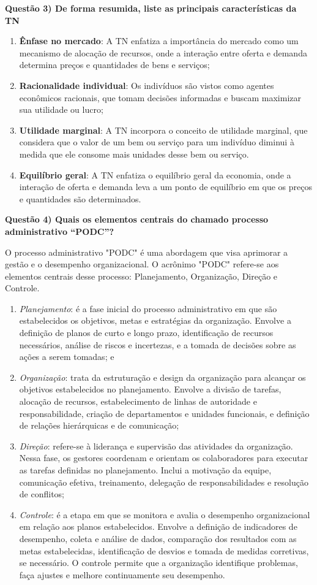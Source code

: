 \documentclass[11pt]{article}
\begin{document}
\noindent \textbf{Questão 3) De forma resumida, liste as principais características da TN}\par
\begin{enumerate}
    \item \textbf{Ênfase no mercado}: A TN enfatiza a importância do mercado como um mecanismo de alocação de recursos, onde a interação entre oferta e demanda determina preços e quantidades de bens e serviços;
    \item \textbf{Racionalidade individual}: Os indivíduos são vistos como agentes econômicos racionais, que tomam decisões informadas e buscam maximizar sua utilidade ou lucro;
    \item \textbf{Utilidade marginal}: A TN incorpora o conceito de utilidade marginal, que considera que o valor de um bem ou serviço para um indivíduo diminui à medida que ele consome mais unidades desse bem ou serviço.
    \item \textbf{Equilíbrio geral}: A TN enfatiza o equilíbrio geral da economia, onde a interação de oferta e demanda leva a um ponto de equilíbrio em que os preços e quantidades são determinados.
\end{enumerate}
\noindent \textbf{Questão 4) Quais os elementos centrais do chamado processo administrativo “PODC”?}
\par O processo administrativo "PODC" é uma abordagem que visa aprimorar a gestão e o desempenho organizacional. O acrônimo "PODC" refere-se aos elementos centrais desse processo: Planejamento, Organização, Direção e Controle.
\begin{enumerate}
    \item \emph{Planejamento}: é a fase inicial do processo administrativo em que são estabelecidos os objetivos, metas e estratégias da organização. Envolve a definição de planos de curto e longo prazo, identificação de recursos necessários, análise de riscos e incertezas, e a tomada de decisões sobre as ações a serem tomadas; e
    \item \emph{Organização}: trata da estruturação e design da organização para alcançar os objetivos estabelecidos no planejamento. Envolve a divisão de tarefas, alocação de recursos, estabelecimento de linhas de autoridade e responsabilidade, criação de departamentos e unidades funcionais, e definição de relações hierárquicas e de comunicação;
    \item \emph{Direção}: refere-se à liderança e supervisão das atividades da organização. Nessa fase, os gestores coordenam e orientam os colaboradores para executar as tarefas definidas no planejamento. Inclui a motivação da equipe, comunicação efetiva, treinamento, delegação de responsabilidades e resolução de conflitos;
    \item \emph{Controle}: é a etapa em que se monitora e avalia o desempenho organizacional em relação aos planos estabelecidos. Envolve a definição de indicadores de desempenho, coleta e análise de dados, comparação dos resultados com as metas estabelecidas, identificação de desvios e tomada de medidas corretivas, se necessário. O controle permite que a organização identifique problemas, faça ajustes e melhore continuamente seu desempenho.
\end{enumerate}
\end{document}
